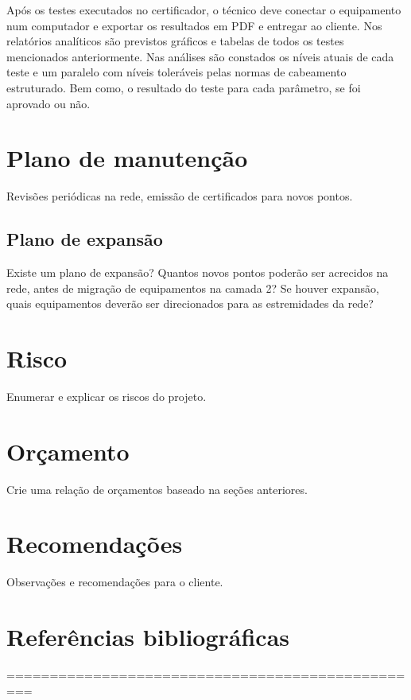 \documentclass[	DIV=calc,%
							paper=a4,%
							fontsize=12pt,%
							onecolumn]{scrartcl}	 					%
\begin{document}
Após os testes executados no certificador, o técnico deve conectar o equipamento num computador e exportar os resultados em PDF e entregar ao cliente. Nos relatórios analíticos são previstos gráficos e tabelas de todos os testes mencionados anteriormente. Nas análises são constados os níveis atuais de cada teste e um paralelo com níveis toleráveis pelas normas de cabeamento estruturado. Bem como, o resultado do teste para cada parâmetro, se foi aprovado ou não.


\section{Plano de manutenção}

Revisões periódicas na rede, emissão de certificados para novos pontos.

\subsection{Plano de expansão}
Existe um plano de expansão? Quantos novos pontos poderão ser acrecidos na rede, antes de migração de equipamentos na camada 2? Se houver expansão, quais equipamentos deverão ser direcionados para as estremidades da rede? 

\section{Risco}
Enumerar e explicar os riscos do projeto.

\section{Orçamento}
Crie uma relação de orçamentos baseado na seções anteriores.

\section{Recomendações}
Observações e recomendações para o cliente.

\section{Referências bibliográficas}

\renewcommand\refname{} %

  

=================================================
\end{document}

